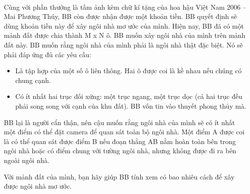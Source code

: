  

Cùng với phần thưởng là tấm ảnh kèm chữ kí tặng của hoa hậu Việt Nam 2006 – Mai Phương Thúy, BB còn được nhận được một khoản tiền. BB quyết định sẽ dùng khoản tiền này để xây ngôi nhà mơ ước của mình. Hiện nay, BB đã có một mảnh đất được chia thành M x N ô. BB muốn xây ngôi nhà của mình trên mảnh đất này. BB muốn rằng ngôi nhà của mình phải là ngôi nhà thật đặc biệt. Nó sẽ phải đáp ứng đủ các yêu cầu:
\begin{itemize}
	\item Là tập hợp của một số ô liên thông. Hai ô được coi là kề nhau nếu chúng có chung cạnh.
	\item Có ít nhất hai trục đối xứng: một trục ngang, một trục dọc (cả hai trục đều phải song song với cạnh của khu đất). BB vốn tin vào thuyết phong thủy mà.
\end{itemize}

BB lại là người cẩn thận, nên cậu muốn rằng ngôi nhà của mình sẽ có ít nhất một điểm có thể đặt camera để quan sát toàn bộ ngôi nhà. Một điểm A được coi là có thể quan sát được điểm B nếu đoạn thẳng AB nằm hoàn toàn bên trong ngôi nhà hoặc có điểm chung với tường ngôi nhà, nhưng không được đi ra bên ngoài ngôi nhà.

Với mảnh đất của mình, bạn hãy giúp BB tính xem có bao nhiêu cách để xây được ngôi nhà mơ ước.

\